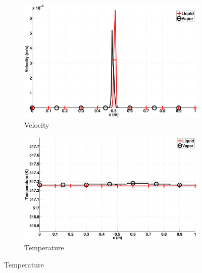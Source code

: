 \documentclass[preprint,10pt]{elsarticle}
\begin{document}
\begin{figure}[H]
        \centering
        \begin{subfigure}[b]{0.495\textwidth}
                \centering
                \includegraphics[width=\textwidth]{figures/hydrostatic-_two_phases_velocity.eps}
                \caption{Velocity}
                \label{fig:hydrostatic--vel}
        \end{subfigure}%
        \begin{subfigure}[b]{0.495\textwidth}
                \centering
                \includegraphics[width=\textwidth]{figures/hydrostatic-_two_phases_temperature.eps}
                \caption{Temperature}
                \label{fig:hydrostatic--density}
        \end{subfigure}
        

\end{figure}
\end{document}
